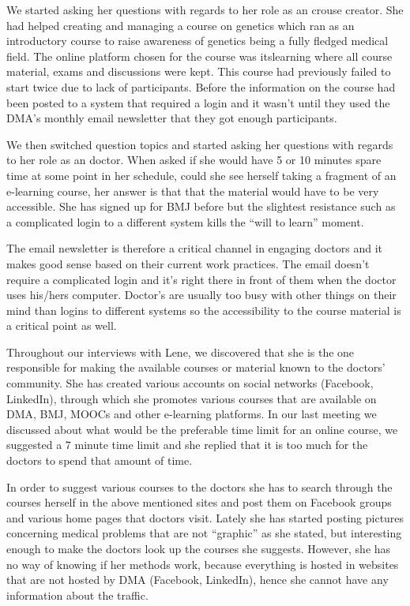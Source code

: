 We started asking her questions with regards to her role as an crouse creator. She had helped creating and managing a course on genetics which ran as an introductory course to raise awareness of genetics being a fully fledged medical field. The online platform chosen for the course was itslearning where all course material, exams and discussions were kept. This course had previously failed to start twice due to lack of participants. Before the information on the course had been posted to a system that required a login and it wasn’t until they used the DMA’s monthly email newsletter that they got enough participants.

We then switched question topics and started asking her questions with regards to her role as an doctor. When asked if she would have 5 or 10 minutes spare time at some point in her schedule, could she see herself taking a fragment of an e-learning course, her answer is that that the material would have to be very accessible. She has signed up for BMJ before but the slightest resistance such as a complicated login to a different system kills the “will to learn” moment.

The email newsletter is therefore a critical channel in engaging doctors and it makes good sense based on their current work practices. The email doesn’t require a complicated login and it’s right there in front of them when the doctor uses his/hers computer. Doctor's are usually too busy with other things on their mind than logins to different systems so the accessibility to the course material is a critical point as well.

Throughout our interviews with Lene, we discovered that she is the one responsible for making the available courses or material known to the doctors' community. She has created various accounts on social networks (Facebook, LinkedIn), through which she promotes various courses that are available on DMA, BMJ, MOOCs and other e-learning platforms. In our last meeting we discussed about what would be the preferable time limit for an online course, we suggested a 7 minute time limit  and she replied that it is too much for the doctors to spend that amount of time.

In order to suggest various courses to the doctors she has to search through the courses herself in the above mentioned sites and post them on Facebook groups and various home pages that doctors visit. Lately she has started posting pictures concerning medical problems that are not “graphic” as she stated, but interesting enough to make the doctors look up the courses she suggests. However, she has no way of knowing if her methods work, because everything is hosted in websites that are not hosted by DMA (Facebook, LinkedIn), hence she cannot have any information about the traffic.

